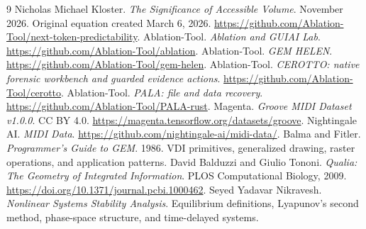 \documentclass[11pt,a4paper]{article}
\begin{document}
\begin{thebibliography}{9}
Nicholas Michael Kloster. \emph{The Significance of Accessible Volume}. November 2026. Original equation created March 6, 2026. \url{https://github.com/Ablation-Tool/next-token-predictability}.
Ablation-Tool. \emph{Ablation and GUIAI Lab}. \url{https://github.com/Ablation-Tool/ablation}.
Ablation-Tool. \emph{GEM HELEN}. \url{https://github.com/Ablation-Tool/gem-helen}.
Ablation-Tool. \emph{CEROTTO: native forensic workbench and guarded evidence actions}. \url{https://github.com/Ablation-Tool/cerotto}.
Ablation-Tool. \emph{PALA: file and data recovery}. \url{https://github.com/Ablation-Tool/PALA-rust}.
Magenta. \emph{Groove MIDI Dataset v1.0.0}. CC BY 4.0. \url{https://magenta.tensorflow.org/datasets/groove}.
Nightingale AI. \emph{MIDI Data}. \url{https://github.com/nightingale-ai/midi-data/}.
Balma and Fitler. \emph{Programmer's Guide to GEM}. 1986. VDI primitives, generalized drawing, raster operations, and application patterns.
David Balduzzi and Giulio Tononi. \emph{Qualia: The Geometry of Integrated Information}. PLOS Computational Biology, 2009. \url{https://doi.org/10.1371/journal.pcbi.1000462}.
Seyed Yadavar Nikravesh. \emph{Nonlinear Systems Stability Analysis}. Equilibrium definitions, Lyapunov's second method, phase-space structure, and time-delayed systems.
\end{thebibliography}
\end{document}
